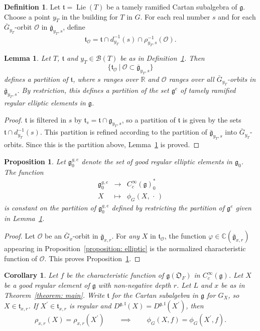 \documentclass[11pt]{amsart}
\newtheorem{proposition}[theorem]{Proposition}
\newtheorem{corollary}[theorem]{Corollary}
\newtheorem{lemma}[theorem]{Lemma}
\theoremstyle{definition}
\newtheorem{definition}[theorem]{Definition}
\theoremstyle{remark}
\numberwithin{equation}{theorem}
\def\R{{\mathbb{R}}}
\def\C{{\mathbb{C}}}
\def\F{{F}}
\def\A{{\mathfrak{O}_\F}}
\def\GF{{G}}
\def\TF{{T}}
\def\LF{{L}}
\def\lF{{\mathfrak{l}}}
\def\tF{{\mathfrak{t}}}
\def\gF{{\mathfrak{g}}}
\def\t{{\mathfrak{t}}}
\newcommand{\ellip}{{e}}
\def\orbint{{\phi}}
\newcommand{\Mf}{{\bar\GF}}
\newcommand{\mf}{{\bar\gF}}
\def\vphi{{\varphi}}
\def\orbit{{\mathcal{O}}}
\def\B{{\mathcal{B}}}
\def\Sch#1{{C^\infty_c(#1)}}
\def\tq{{\ \vert\ }}
\def\Lie{{\operatorname{Lie}}}
\begin{document}
\begin{definition}\label{4.2}
Let $\tF = \Lie(\TF)$ be a tamely ramified Cartan subalgebra of
$\gF$. Choose a point $y_\TF$ in the building for $\TF$ in $\GF$.
For each real number $s$ and for each $\Mf_{y_\TF}$-orbit $\orbit$
in $\mf_{y_{\TF},s}$, define
\begin{equation}
\tF_\orbit = \tF \cap d_{y_\TF}^{-1}(s) \cap
\rho_{y_\TF,s}^{-1}(\orbit).
\end{equation}
\end{definition}

\begin{lemma}\label{4.3}
Let $\TF$, $\tF$ and $y_\TF\in \B(\TF)$ be as in
Definition~\ref{4.2}. Then
\[
\{ \tF_\orbit \tq \orbit \subset \mf_{y_\TF,s}\}
\]
defines a partition of $\tF$, where $s$ ranges over $\R$ and
$\orbit$ ranges over all $\Mf_{y_\TF}$-orbits in $\mf_{y_\TF,s}$.
By restriction, this defines a partition of the set $\gF^\ellip$ of
tamely ramified regular elliptic elements in $\gF$.
\end{lemma}

\begin{proof}
$\tF$ is filtered in $s$ by $\tF_s = \tF \cap \gF_{y_\TF,s}$, so a
partition of $\tF$ is given by the sets $\tF \cap
d_{y_\TF}^{-1}(s)$. This partition is refined according to the
partition of $\mf_{y_\TF,s}$ into $\Mf_{y_\TF}$-orbits. Since this
is the partition above, Lemma~\ref{4.3} is proved.
\end{proof}


\begin{proposition}\label{4.4}
Let $\gF^{g,e}_0$ denote the set of good regular elliptic elements
in $\gF_0$. The function
\begin{eqnarray*}
\gF^{g,e}_0 &\to& \Sch{\gF}_0^\ast\\
X &\mapsto&\orbint_\GF(X,\, \cdot\, )
\end{eqnarray*}
is constant on the partition of $\gF^{g,e}_0$ defined by
restricting the partition of $\gF^\ellip$ given in
Lemma~\ref{4.3}.
\end{proposition}


\begin{proof}
Let $\orbit$ be an $\Mf_x$-orbit in $\mf_{x,r}$. For {\it any} $X$
in $\t_\orbit$, the function $\vphi \in \C(\mf_{x,r})$ appearing
in Proposition~\ref{proposition: elliptic} is the normalized
characteristic function of $\orbit$. This proves
Proposition~\ref{4.4}.
\end{proof}


\begin{corollary}\label{cor:unit element}
Let $f$ be the characteristic function of $\gF(\A)$ in
$\Sch{\gF}$. Let $X$ be a good regular element of $\gF$ with
non-negative depth $r$. Let $\LF$ and $x$ be as in
Theorem~\ref{theorem: main}. Write $\tF$ for the Cartan subalgebra
in $\gF$ for $\GF_X$, so $X\in \tF_{x,r}$. If $X^\prime \in
\tF_{x,r}$ is regular and $D^{\gF,\lF}(X) =
D^{\gF,\lF}(X^\prime)$, then
\begin{equation}
\rho_{x,r}(X) = \rho_{x,r}(X^\prime) \qquad\implies\qquad
\orbint_\GF(X,f) =\orbint_\GF(X^\prime,f).
\end{equation}
\end{corollary}
\end{document}
